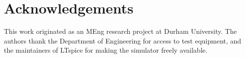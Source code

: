 \section*{Acknowledgements}
This work originated as an MEng research project at Durham University. The authors thank the Department of Engineering for access to test equipment, and the maintainers of LTspice for making the simulator freely available.
\printbibliography
\ifjxcdc
\else
\begin{appendices}

\end{appendices}
\fi
